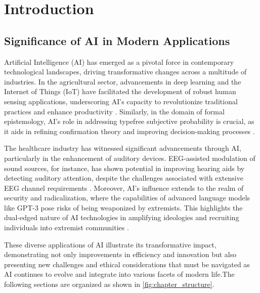 \section{Introduction} \label{sec:Introduction}


\subsection{Significance of AI in Modern Applications} \label{subsec:Significance of AI in Modern Applications}

Artificial Intelligence (AI) has emerged as a pivotal force in contemporary technological landscapes, driving transformative changes across a multitude of industries. In the agricultural sector, advancements in deep learning and the Internet of Things (IoT) have facilitated the development of robust human sensing applications, underscoring AI's capacity to revolutionize traditional practices and enhance productivity \cite{kaur2024cropcontextwiserobuststatic}. Similarly, in the domain of formal epistemology, AI's role in addressing typefree subjective probability is crucial, as it aids in refining confirmation theory and improving decision-making processes \cite{cieslinski2022axiomstypefreesubjectiveprobability}. 



The healthcare industry has witnessed significant advancements through AI, particularly in the enhancement of auditory devices. EEG-assisted modulation of sound sources, for instance, has shown potential in improving hearing aids by detecting auditory attention, despite the challenges associated with extensive EEG channel requirements \cite{haghighi2017eegassistedmodulationsoundsources}. Moreover, AI's influence extends to the realm of security and radicalization, where the capabilities of advanced language models like GPT-3 pose risks of being weaponized by extremists. This highlights the dual-edged nature of AI technologies in amplifying ideologies and recruiting individuals into extremist communities \cite{mcguffie2020radicalizationrisksgpt3advanced}. 



These diverse applications of AI illustrate its transformative impact, demonstrating not only improvements in efficiency and innovation but also presenting new challenges and ethical considerations that must be navigated as AI continues to evolve and integrate into various facets of modern life.The following sections are organized as shown in \autoref{fig:chapter_structure}.








